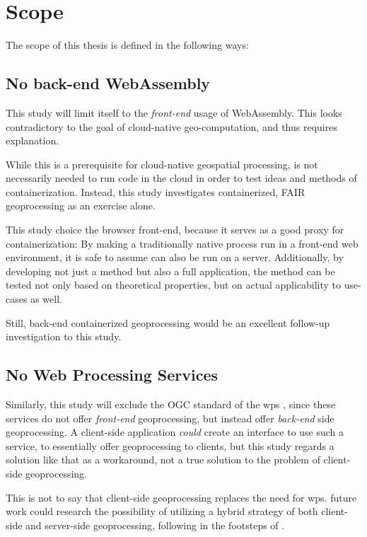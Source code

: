 \newpage
\section{Scope}
The scope of this thesis is defined in the following ways: 


\subsection*{ No back-end WebAssembly } 
This study will limit itself to the \emph{front-end} usage of WebAssembly. This looks contradictory to the goal of cloud-native geo-computation, and thus requires explanation.

While this is a prerequisite for cloud-native geospatial processing, is not necessarily needed to run code in the cloud in order to test ideas and methods of containerization. 
Instead, this study investigates containerized, FAIR geoprocessing as an exercise alone.  


This study choice the browser front-end, because it serves as a good proxy for containerization:
By making a traditionally native process run in a front-end web environment, it is safe to assume can also be run on a server. 
Additionally, by developing not just a method but also a full application, the method can be tested not only based on theoretical properties, but on actual applicability to use-cases as well. 

Still, back-end containerized geoprocessing would be an excellent follow-up investigation to this study. 

\subsection*{ No Web Processing Services } 
Similarly, this study will exclude the OGC standard of the \ac{wps} \cite{ogc_web_2015}, since these services do not offer \emph{front-end} geoprocessing, but instead offer \emph{back-end} side geoprocessing. A client-side application \textit{could} create an interface to use such a service, to essentially offer geoprocessing to clients, but this study regards a solution like that as a workaround, not a true solution to the problem of client-side geoprocessing. 

This is not to say that client-side geoprocessing replaces the need for \ac{wps}. 
future work could research the possibility of utilizing a hybrid strategy of both client-side and server-side geoprocessing, following in the footsteps of \cite{panidi_hybrid_2015}. 

